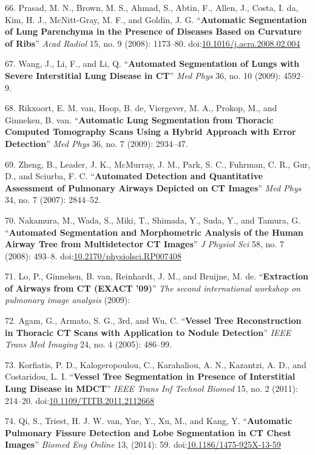 \documentclass[11pt,]{article}
\begin{document}
66. Prasad, M. N., Brown, M. S., Ahmad, S., Abtin, F., Allen, J., Costa,
I. da, Kim, H. J., McNitt-Gray, M. F., and Goldin, J. G.
``\textbf{Automatic Segmentation of Lung Parenchyma in the Presence of
Diseases Based on Curvature of Ribs}'' \emph{Acad Radiol} 15, no. 9
(2008): 1173--80.
doi:\href{http://dx.doi.org/10.1016/j.acra.2008.02.004}{10.1016/j.acra.2008.02.004}

67. Wang, J., Li, F., and Li, Q. ``\textbf{Automated Segmentation of
Lungs with Severe Interstitial Lung Disease in CT}'' \emph{Med Phys} 36,
no. 10 (2009): 4592--9.

68. Rikxoort, E. M. van, Hoop, B. de, Viergever, M. A., Prokop, M., and
Ginneken, B. van. ``\textbf{Automatic Lung Segmentation from Thoracic
Computed Tomography Scans Using a Hybrid Approach with Error
Detection}'' \emph{Med Phys} 36, no. 7 (2009): 2934--47.

69. Zheng, B., Leader, J. K., McMurray, J. M., Park, S. C., Fuhrman, C.
R., Gur, D., and Sciurba, F. C. ``\textbf{Automated Detection and
Quantitative Assessment of Pulmonary Airways Depicted on CT Images}''
\emph{Med Phys} 34, no. 7 (2007): 2844--52.

70. Nakamura, M., Wada, S., Miki, T., Shimada, Y., Suda, Y., and Tamura,
G. ``\textbf{Automated Segmentation and Morphometric Analysis of the
Human Airway Tree from Multidetector CT Images}'' \emph{J Physiol Sci}
58, no. 7 (2008): 493--8.
doi:\href{http://dx.doi.org/10.2170/physiolsci.RP007408}{10.2170/physiolsci.RP007408}

71. Lo, P., Ginneken, B. van, Reinhardt, J. M., and Bruijne, M. de.
``\textbf{Extraction of Airways from CT (EXACT '09)}'' \emph{The second
international workshop on pulmonary image analysis} (2009):

72. Agam, G., Armato, S. G., 3rd, and Wu, C. ``\textbf{Vessel Tree
Reconstruction in Thoracic CT Scans with Application to Nodule
Detection}'' \emph{IEEE Trans Med Imaging} 24, no. 4 (2005): 486--99.

73. Korfiatis, P. D., Kalogeropoulou, C., Karahaliou, A. N., Kazantzi,
A. D., and Costaridou, L. I. ``\textbf{Vessel Tree Segmentation in
Presence of Interstitial Lung Disease in MDCT}'' \emph{IEEE Trans Inf
Technol Biomed} 15, no. 2 (2011): 214--20.
doi:\href{http://dx.doi.org/10.1109/TITB.2011.2112668}{10.1109/TITB.2011.2112668}

74. Qi, S., Triest, H. J. W. van, Yue, Y., Xu, M., and Kang, Y.
``\textbf{Automatic Pulmonary Fissure Detection and Lobe Segmentation in
CT Chest Images}'' \emph{Biomed Eng Online} 13, (2014): 59.
doi:\href{http://dx.doi.org/10.1186/1475-925X-13-59}{10.1186/1475-925X-13-59}
\end{document}
